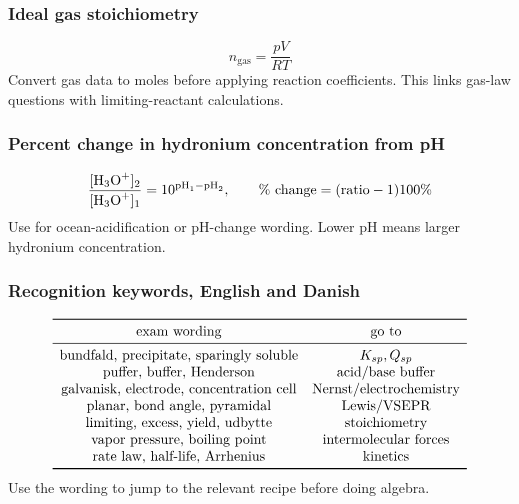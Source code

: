 \subsubsection{Ideal gas stoichiometry}
\[
n_{\mathrm{gas}}=\frac{pV}{RT}
\]
Convert gas data to moles before applying reaction coefficients. This links gas-law questions with limiting-reactant calculations.

\subsubsection{Percent change in hydronium concentration from pH}
\[
\frac{[\ce{H3O+}]_2}{[\ce{H3O+}]_1}=10^{\mathrm{pH}_1-\mathrm{pH}_2}, \qquad
\%\text{ change}=(\text{ratio}-1)100\%
\]
Use for ocean-acidification or pH-change wording. Lower pH means larger hydronium concentration.

\subsubsection{Recognition keywords, English and Danish}
\[
\begin{array}{c c}
\toprule
\text{exam wording} & \text{go to}\\
\midrule
\text{bundfald, precipitate, sparingly soluble} & K_{sp}, Q_{sp}\\
\text{puffer, buffer, Henderson} & \text{acid/base buffer}\\
\text{galvanisk, electrode, concentration cell} & \text{Nernst/electrochemistry}\\
\text{planar, bond angle, pyramidal} & \text{Lewis/VSEPR}\\
\text{limiting, excess, yield, udbytte} & \text{stoichiometry}\\
\text{vapor pressure, boiling point} & \text{intermolecular forces}\\
\text{rate law, half-life, Arrhenius} & \text{kinetics}\\
\bottomrule
\end{array}
\]
Use the wording to jump to the relevant recipe before doing algebra.
